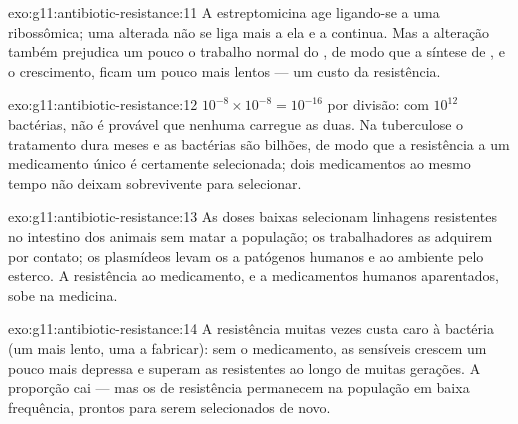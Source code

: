 \begin{solution}{exo:g11:antibiotic-resistance:11}
A estreptomicina age ligando-se a uma  ribossômica; uma
 alterada não se liga mais a ela e a  continua. Mas a
alteração também prejudica um pouco o trabalho normal do , de
modo que a síntese de , e o crescimento, ficam um pouco mais
lentos --- um custo da resistência.
\end{solution}

\begin{solution}{exo:g11:antibiotic-resistance:12}
$10^{-8} \times 10^{-8} = 10^{-16}$ por divisão: com $10^{12}$
bactérias, não é provável que nenhuma  carregue as duas. Na
tuberculose o tratamento dura meses e as bactérias são bilhões, de modo
que a resistência a um medicamento único é certamente selecionada; dois
medicamentos ao mesmo tempo não deixam sobrevivente para selecionar.
\end{solution}

\begin{solution}{exo:g11:antibiotic-resistance:13}
As doses baixas selecionam linhagens resistentes no intestino dos
animais sem matar a população; os trabalhadores as adquirem por
contato; os plasmídeos levam os  a patógenos humanos e ao ambiente
pelo esterco. A resistência ao medicamento, e a medicamentos humanos
aparentados, sobe na medicina.
\end{solution}

\begin{solution}{exo:g11:antibiotic-resistance:14}
A resistência muitas vezes custa caro à bactéria (um  mais
lento, uma  a fabricar): sem o medicamento, as  sensíveis
crescem um pouco mais depressa e superam as resistentes ao longo de
muitas gerações. A proporção cai --- mas os  de resistência
permanecem na população em baixa frequência, prontos para serem
selecionados de novo.
\end{solution}

